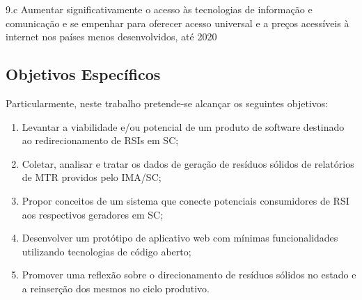 \begin{citacao}
	9.c Aumentar significativamente o acesso às tecnologias de informação e comunicação e se empenhar para oferecer acesso universal e a preços acessíveis à internet nos países menos desenvolvidos, até 2020
\end{citacao}

\subsection{Objetivos Específicos}

Particularmente, neste trabalho pretende-se alcançar os seguintes objetivos:
\begin{enumerate}
    \item Levantar a viabilidade e/ou potencial de um produto de software destinado ao redirecionamento de \gls{RSI}s em \gls{SC};
	\item Coletar, analisar e tratar os dados de geração de resíduos sólidos de relatórios de \gls{MTR} providos pelo \gls{IMA/SC};
	\item Propor conceitos de um sistema que conecte potenciais consumidores de \gls{RSI} aos respectivos geradores em \gls{SC};
	\item Desenvolver um protótipo de aplicativo web com mínimas funcionalidades utilizando tecnologias de código aberto;
	\item Promover uma reflexão sobre o direcionamento de resíduos sólidos no estado e a reinserção dos mesmos no ciclo produtivo.
\end{enumerate}